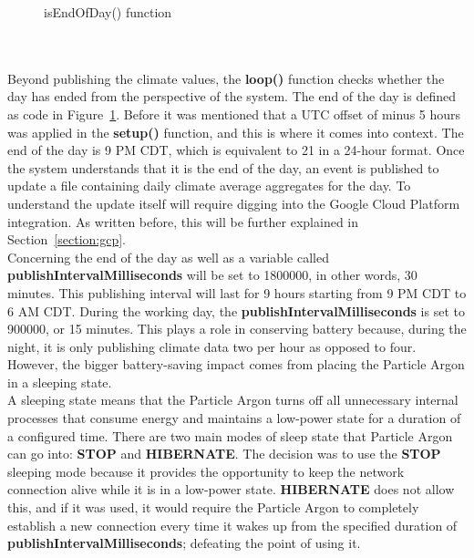 \documentclass{article}
\begin{document}
\begin{minipage}[c]{\textwidth}
    \begin{figure}[H]
        
        \caption{isEndOfDay() function}
        \label{fig:endofday}
    \end{figure}
\end{minipage}\ \\\\

Beyond publishing the climate values, the \textbf{loop()} function checks whether the day has ended from the perspective of the system. The end of the day is defined as code in Figure~\ref{fig:endofday}. Before it was mentioned that a UTC offset of minus 5 hours was applied in the \textbf{setup()} function, and this is where it comes into context. The end of the day is 9 PM CDT, which is equivalent to 21 in a 24-hour format. Once the system understands that it is the end of the day, an event is published to update a file containing daily climate average aggregates for the day. To understand the update itself will require digging into the Google Cloud Platform integration. As written before, this will be further explained in Section~\ref{section:gcp}.\\

Concerning the end of the day as well as a variable called \textbf{publishIntervalMilliseconds} will be set to 1800000, in other words, 30 minutes. This publishing interval will last for 9 hours starting from 9 PM CDT to 6 AM CDT. During the working day, the \textbf{publishIntervalMilliseconds} is set to 900000, or 15 minutes. This plays a role in conserving battery because, during the night, it is only publishing climate data two per hour as opposed to four. However, the bigger battery-saving impact comes from placing the Particle Argon in a sleeping state.\\

A sleeping state means that the Particle Argon turns off all unnecessary internal processes that consume energy and maintains a low-power state for a duration of a configured time. There are two main modes of sleep state that Particle Argon can go into: \textbf{STOP} and \textbf{HIBERNATE}. The decision was to use the \textbf{STOP} sleeping mode because it provides the opportunity to keep the network connection alive while it is in a low-power state. \textbf{HIBERNATE} does not allow this, and if it was used, it would require the Particle Argon to completely establish a new connection every time it wakes up from the specified duration of \textbf{publishIntervalMilliseconds}; defeating the point of using it.
\end{document}
